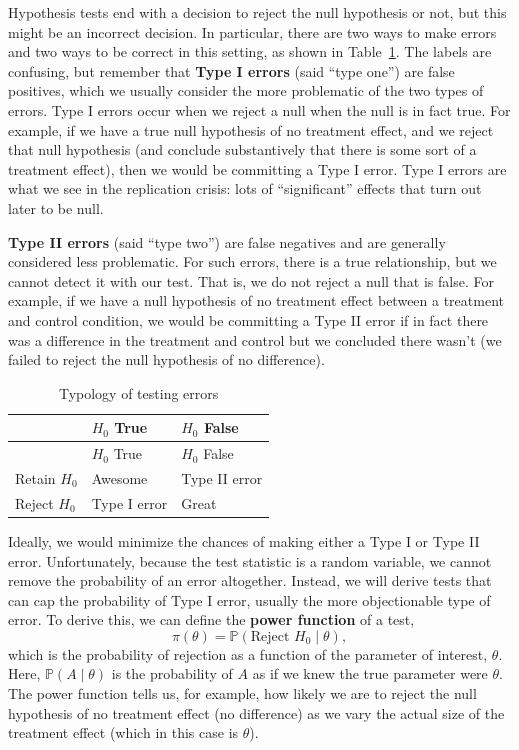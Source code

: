 \documentclass[
  13pt,
  letterpaper,
  DIV=11,
  numbers=noendperiod]{scrreprt}
\renewcommand{\P}{\mathbb{P}}
\theoremstyle{plain}
\theoremstyle{plain}
\theoremstyle{definition}
\theoremstyle{definition}
\theoremstyle{remark}
\begin{document}
Hypothesis tests end with a decision to reject the null hypothesis or
not, but this might be an incorrect decision. In particular, there are
two ways to make errors and two ways to be correct in this setting, as
shown in Table~\ref{tbl-errors}. The labels are confusing, but remember
that \textbf{Type I errors} (said ``type one'') are false positives,
which we usually consider the more problematic of the two types of
errors. Type I errors occur when we reject a null when the null is in
fact true. For example, if we have a true null hypothesis of no
treatment effect, and we reject that null hypothesis (and conclude
substantively that there is some sort of a treatment effect), then we
would be committing a Type I error. Type I errors are what we see in the
replication crisis: lots of ``significant'' effects that turn out later
to be null.

\textbf{Type II errors} (said ``type two'') are false negatives and are
generally considered less problematic. For such errors, there is a true
relationship, but we cannot detect it with our test. That is, we do not
reject a null that is false. For example, if we have a null hypothesis
of no treatment effect between a treatment and control condition, we
would be committing a Type II error if in fact there was a difference in
the treatment and control but we concluded there wasn't (we failed to
reject the null hypothesis of no difference).

\begin{longtable}[]{@{}lll@{}}
\caption{Typology of testing errors}\label{tbl-errors}\tabularnewline
\toprule\noalign{}
& \(H_0\) True & \(H_0\) False \\
\midrule\noalign{}
\endfirsthead
\toprule\noalign{}
& \(H_0\) True & \(H_0\) False \\
\midrule\noalign{}
\endhead
\bottomrule\noalign{}
\endlastfoot
Retain \(H_0\) & Awesome & Type II error \\
Reject \(H_0\) & Type I error & Great \\
\end{longtable}

Ideally, we would minimize the chances of making either a Type I or Type
II error. Unfortunately, because the test statistic is a random
variable, we cannot remove the probability of an error altogether.
Instead, we will derive tests that can cap the probability of Type I
error, usually the more objectionable type of error. To derive this, we
can define the \textbf{power function} of a test, \[ 
\pi(\theta) = \P\left( \text{Reject } H_0 \mid \theta \right),
\] which is the probability of rejection as a function of the parameter
of interest, \(\theta\). Here, \(\P(A \mid \theta)\) is the probability
of \(A\) as if we knew the true parameter were \(\theta\). The power
function tells us, for example, how likely we are to reject the null
hypothesis of no treatment effect (no difference) as we vary the actual
size of the treatment effect (which in this case is \(\theta\)).
\end{document}
